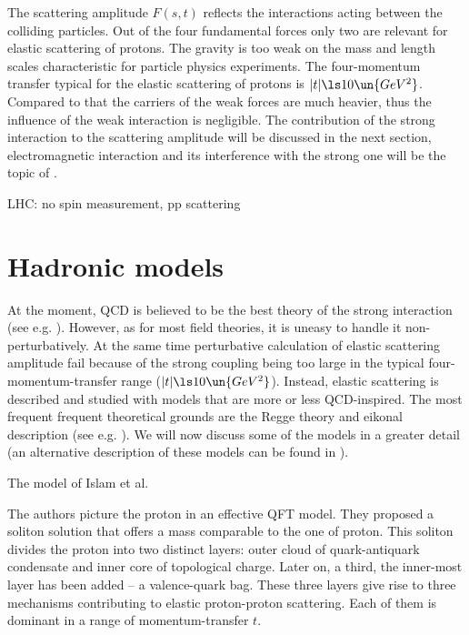 The scattering amplitude $F(s, t)$ reflects the interactions acting between the colliding particles. Out of the four fundamental forces only two are relevant for elastic scattering of protons. The gravity is too weak on the mass and length scales characteristic for particle physics experiments. The four-momentum transfer typical for the elastic scattering of protons is $|t| \ls 10\un{GeV^2}$. Compared to that the carriers of the weak forces are much heavier, thus the influence of the weak interaction is negligible. The contribution of the strong interaction to the scattering amplitude will be discussed in the next section, electromagnetic interaction and its interference with the strong one will be the topic of .

LHC: no spin measurement, pp scattering



\section[el models]{Hadronic models}

At the moment, QCD is believed to be the best theory of the strong interaction (see e.g. ). However, as for most field theories, it is uneasy to handle it non-perturbatively. At the same time perturbative calculation of elastic scattering amplitude fail because of the strong coupling being too large in the typical four-momentum-transfer range ($|t| \ls 10\un{GeV^2}$). Instead, elastic scattering is described and studied with models that are more or less QCD-inspired. The most frequent frequent theoretical grounds are the Regge theory and eikonal description (see e.g. ). We will now discuss some of the models in a greater detail (an alternative description of these models can be found in ).

\caption{The model of Islam et al. }

The authors picture the proton in an effective QFT model. They proposed a soliton solution that offers a mass comparable to the one of proton. This soliton divides the proton into two distinct layers: outer cloud of quark-antiquark condensate and inner core of topological charge. Later on, a third, the inner-most layer has been added -- a valence-quark bag. These three layers give rise to three mechanisms contributing to elastic proton-proton scattering. Each of them is dominant in a range of momentum-transfer $t$.

